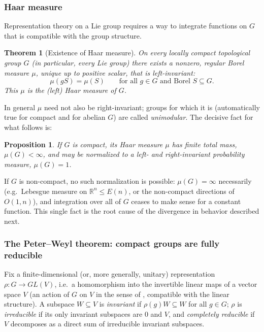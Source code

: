 \documentclass[11pt]{article}
\theoremstyle{plain}
\newtheorem{Theorem}{Theorem}[section]
\newtheorem{Proposition}{Proposition}[section]
\theoremstyle{definition}
\begin{document}
\subsubsection{Haar measure}
\label{subsubsec:haar-measure}

Representation theory on a Lie group requires a way to integrate functions
on $G$ that is compatible with the group structure.

\begin{Theorem}[Existence of Haar measure]
\label{thm:haar-measure}
On every locally compact topological group $G$ (in particular, every Lie
group) there exists a nonzero, regular Borel measure $\mu$, unique up to
positive scalar, that is \emph{left-invariant}:
\[
    \mu(gS) = \mu(S) \qquad \text{for all } g \in G \text{ and Borel } S \subseteq G.
\]
This $\mu$ is the \emph{(left) Haar measure} of $G$.
\end{Theorem}

In general $\mu$ need not also be right-invariant; groups for which it is
(automatically true for compact and for abelian $G$) are called
\emph{unimodular}. The decisive fact for what follows is:

\begin{Proposition}
\label{prop:compact-haar-finite}
If $G$ is compact, its Haar measure $\mu$ has finite total mass,
$\mu(G) < \infty$, and may be normalized to a left- and right-invariant
probability measure, $\mu(G) = 1$.
\end{Proposition}

If $G$ is non-compact, no such normalization is possible: $\mu(G) = \infty$
necessarily (e.g.\ Lebesgue measure on $\mathbb{R}^n \leq E(n)$, or the
non-compact directions of $O(1,n)$), and integration over all of $G$ ceases
to make sense for a constant function. This single fact is the root cause of
the divergence in behavior described next.

\subsubsection{The Peter--Weyl theorem: compact groups are fully reducible}
\label{subsubsec:peter-weyl}

Fix a finite-dimensional (or, more generally, unitary) representation
$\rho : G \to GL(V)$, i.e.\ a homomorphism into the invertible linear maps of
a vector space $V$ (an action of $G$ on $V$ in the sense of
, compatible with the linear structure). A
subspace $W \subseteq V$ is \emph{invariant} if $\rho(g)W \subseteq W$ for
all $g \in G$; $\rho$ is \emph{irreducible} if its only invariant subspaces
are $0$ and $V$, and \emph{completely reducible} if $V$ decomposes as a
direct sum of irreducible invariant subspaces.
\end{document}
